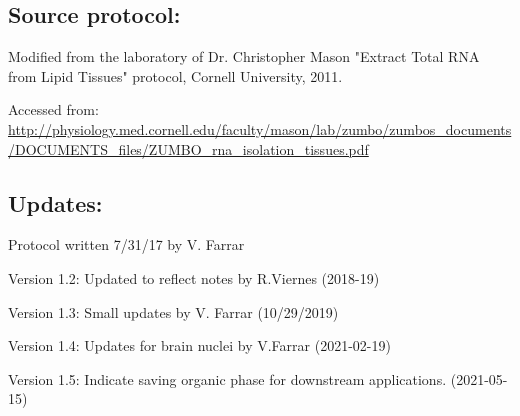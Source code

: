 \documentclass[a4paper,12pt,twoside]{book}
\begin{document}
 \subsection*{Source protocol:}	
	Modified from the laboratory of Dr. Christopher Mason "Extract Total RNA from Lipid Tissues" protocol, Cornell University, 2011.
	
	Accessed from: \url{http://physiology.med.cornell.edu/faculty/mason/lab/zumbo/zumbos_documents/DOCUMENTS_files/ZUMBO_rna_isolation_tissues.pdf}

 \subsection*{Updates:}
 Protocol written 7/31/17 by V. Farrar
 
 Version 1.2: Updated to reflect notes by R.Viernes (2018-19)
 
 Version 1.3: Small updates by V. Farrar (10/29/2019)
 
 Version 1.4: Updates for brain nuclei by V.Farrar (2021-02-19)
 
 Version 1.5: Indicate saving organic phase for downstream applications. (2021-05-15)
	
\end{document}

